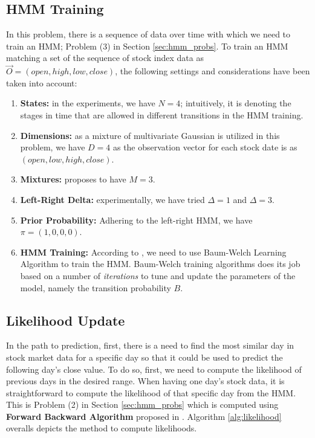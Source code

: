 \documentclass{acm_proc_article-sp}
\begin{document}
\subsection{HMM Training} \label{sec:train}
In this problem, there is a sequence of data over time with which we need to train an HMM; Problem (3) in Section
\ref{sec:hmm_probs}. To train an HMM matching a set of the sequence of stock index data as $\vec{O} = (open, high, low,
close)$, the following settings and considerations have been taken into account:
\begin{enumerate}
  \item \textbf{States:} in the experiments, we have $N = 4$; intuitively, it is denoting the stages in time that are
  allowed in different transitions in the HMM training.
  \item \textbf{Dimensions:} as a mixture of multivariate Gaussian is utilized in this problem, we have $D = 4$ as the
  observation vector for each stock date is as $(open, low, high, close)$.
  \item \textbf{Mixtures:} \cite{hassan:hmm_stock} proposes to have $M = 3$.
  \item \textbf{Left-Right Delta:} experimentally, we have tried $\Delta = 1$ and $\Delta = 3$.
  \item \textbf{Prior Probability:} Adhering to the left-right HMM, we have $\pi = (1, 0, 0, 0)$.
  \item \textbf{HMM Training:} According to \cite{hassan:hmm_stock,rabiner:hmm}, we need to use Baum-Welch Learning
  Algorithm to train the HMM. Baum-Welch training algorithms does its job based on a number of \textit{iterations} to
  tune and update the parameters of the model, namely the transition probability $B$. 
\end{enumerate}

\subsection{Likelihood Update} \label{sec:likelihood}
In the path to prediction, first, there is a need to find the most similar day in stock market data for a specific day
so that it could be used to predict the following day's close value. To do so, first, we need to compute the
likelihood of previous days in the desired range. When having one day's stock data, it is straightforward to compute
the likelihood of that specific day from the HMM. This is Problem (2) in Section \ref{sec:hmm_probs} which is computed using
\textbf{Forward Backward Algorithm} proposed in \cite{rabiner:hmm,erwin:datamining,wiki:hmm}. Algorithm
\ref{alg:likelihood} overalls depicts the method to compute likelihoods.
\end{document}
